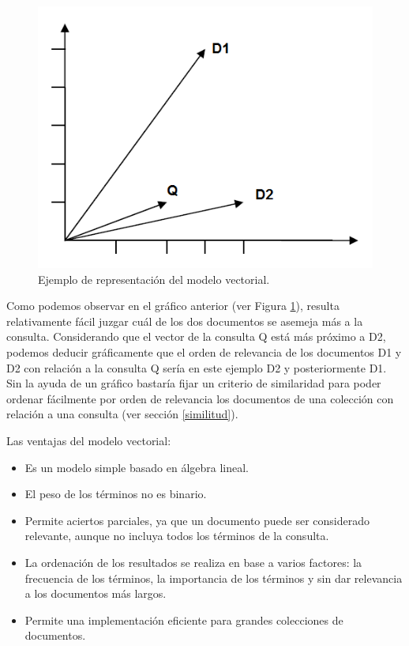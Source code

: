 \documentclass[titlepage]{article}
\begin{document}
\begin{figure}[h]
	\begin{center}
		\includegraphics*[scale=0.5]{grafica.png}
	\end{center}
	\caption{Ejemplo de representación del modelo vectorial.}
	\label{fig: Figure 7}
\end{figure}

Como podemos observar en el gráfico anterior (ver Figura \ref{fig: Figure 7}), resulta relativamente fácil juzgar cuál de los dos documentos se asemeja más a la consulta. Considerando que el vector de la consulta Q está más próximo a D2, podemos deducir gráficamente que el orden de relevancia de los documentos D1 y D2 con relación a la consulta Q sería en este ejemplo D2 y posteriormente D1. Sin la ayuda de un gráfico bastaría fijar un criterio de similaridad para poder ordenar fácilmente por orden de relevancia los documentos de una colección con relación a una consulta (ver sección \ref{similitud}).

Las ventajas del modelo vectorial:

\begin{itemize}
	\item Es un modelo simple basado en álgebra lineal. 
	\item El peso de los términos no es binario. 
	\item Permite aciertos parciales, ya que un documento puede ser considerado relevante, aunque no incluya todos los términos de la consulta. 
	\item La ordenación de los resultados se realiza en base a varios factores: la frecuencia de los términos, la importancia de los términos y sin dar relevancia a los documentos más largos. 
	\item Permite una implementación eficiente para grandes colecciones de documentos.
\end{itemize}
\end{document}
